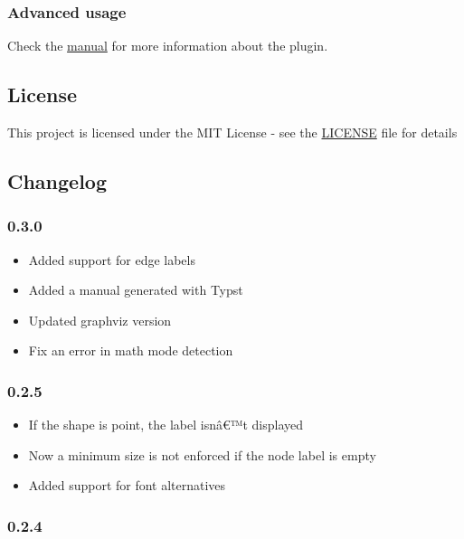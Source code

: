 \subsubsection{Advanced usage}\label{advanced-usage}

Check the
\href{https://raw.githubusercontent.com/Robotechnic/diagraph/main/doc/manual.pdf}{manual}
for more information about the plugin.

\subsection{License}\label{license}

This project is licensed under the MIT License - see the
\href{https://github.com/typst/packages/raw/main/packages/preview/diagraph/0.3.0/LICENSE}{LICENSE}
file for details

\subsection{Changelog}\label{changelog}

\subsubsection{0.3.0}\label{section}

\begin{itemize}
\tightlist
\item
  Added support for edge labels
\item
  Added a manual generated with Typst
\item
  Updated graphviz version
\item
  Fix an error in math mode detection
\end{itemize}

\subsubsection{0.2.5}\label{section-1}

\begin{itemize}
\tightlist
\item
  If the shape is point, the label isnâ€™t displayed
\item
  Now a minimum size is not enforced if the node label is empty
\item
  Added support for font alternatives
\end{itemize}

\subsubsection{0.2.4}\label{section-2}

